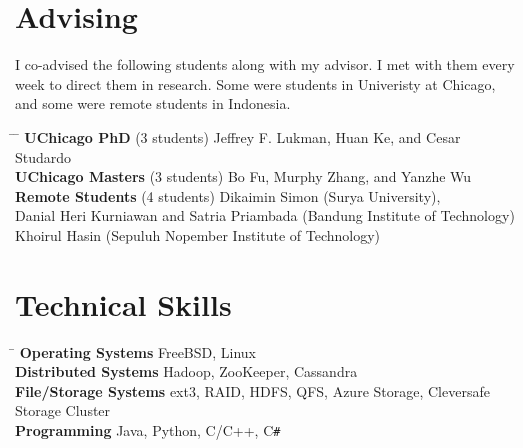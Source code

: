 \documentclass[10pt]{article} %
\begin{document}

\section{Advising}

I co-advised the following students along with my advisor. I met with them
every week to direct them in research. Some were students in Univeristy at
Chicago, and some were remote students in Indonesia.
\begin{tabbing}
\hspace{3.5cm} \= \hspace{2.5cm} \= \kill
\textbf{UChicago PhD} \> (3 students) \> Jeffrey F. Lukman, Huan Ke, and Cesar Studardo\\
\textbf{UChicago Masters} \> (3 students) \> Bo Fu, Murphy Zhang, and Yanzhe Wu\\
\textbf{Remote Students} \> (4 students) \> Dikaimin Simon (Surya University),\\
\> \>Danial Heri Kurniawan and Satria Priambada (Bandung Institute of Technology)\\
\> \>Khoirul Hasin (Sepuluh Nopember Institute of Technology)
\end{tabbing}


\section{Technical Skills}

\begin{tabbing}
\hspace{4cm} \= \kill
\textbf{Operating Systems} \> FreeBSD, Linux \\
\textbf{Distributed Systems} \> Hadoop, ZooKeeper, Cassandra \\
\textbf{File/Storage Systems} \> ext3, RAID, HDFS, QFS, Azure Storage, Cleversafe Storage Cluster\\
\textbf{Programming} \> Java, Python, C/C++, C\texttt{\#}
\end{tabbing}
\end{document}
